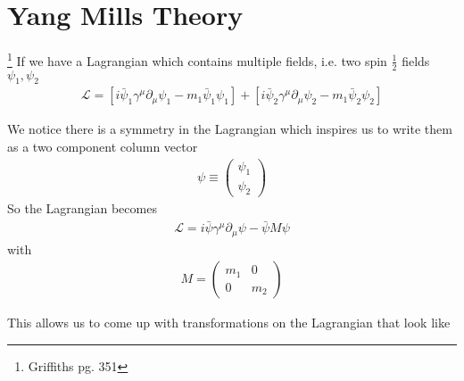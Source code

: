 \section{Yang Mills Theory}
\footnote{Griffiths pg. 351}
If we have a Lagrangian which contains multiple fields, i.e. two spin $\frac{1}{2}$ fields $\psi_1, \psi_2$
\begin{align}
\mathcal{L} = [i\bar{\psi}_1\gamma^\mu\partial_\mu\psi_1 - m_1\bar{\psi}_1\psi_1] + [i\bar{\psi}_2\gamma^\mu\partial_\mu\psi_2 - m_1\bar{\psi}_2\psi_2]
\end{align}

We notice there is a symmetry in the Lagrangian which inspires us to write them as a two component column vector
\begin{align}
\psi \equiv \begin{pmatrix}
\psi_1\\
\psi_2
\end{pmatrix}
\end{align}
So the Lagrangian becomes
\begin{align}
\mathcal{L} = i\bar{\psi}\gamma^\mu\partial_\mu\psi - \bar{\psi}M\psi
\end{align}
with
\begin{align}
M = \begin{pmatrix}
m_1 & 0\\
0 & m_2
\end{pmatrix}
\end{align}

This allows us to come up with transformations on the Lagrangian that look like

